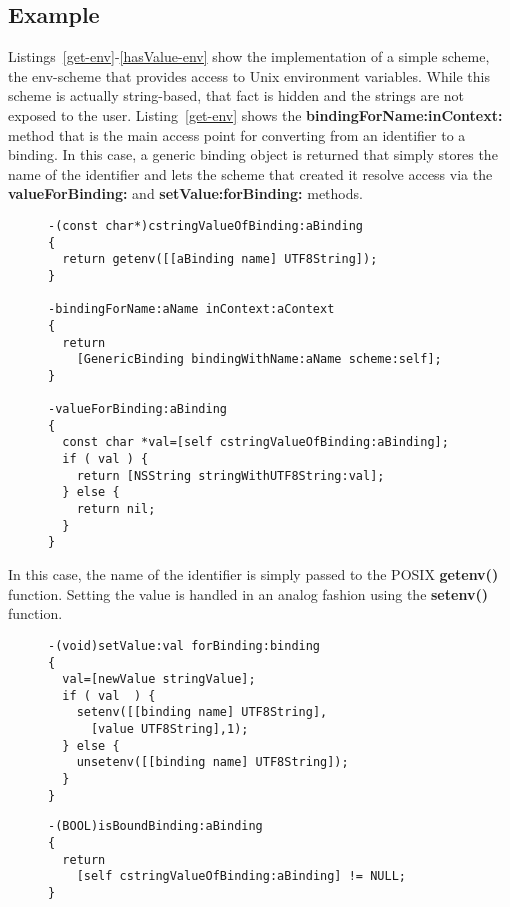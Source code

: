 \documentclass[preprint,authoryear]{acm_proc_article-sp}
\begin{document}
\subsection{Example}

Listings~\ref{get-env}-\ref{hasValue-env} show the implementation of a simple scheme,
the env-scheme that provides access to Unix environment variables.  While this scheme
is actually string-based, that fact is hidden and the strings are not exposed to the user.
Listing~\ref{get-env}
shows the {\bf bindingForName:inContext:} method that is the main access point for
converting from an identifier to a binding.  In this case, a generic binding object is returned
that simply stores the name of the identifier and lets the scheme that created it resolve
access via the {\bf valueForBinding:} and {\bf setValue:forBinding:} methods.


\begin{figure}[htbp]
\begin{lstlisting}[style=L,label=get-env,caption=Basic lookup in env: scheme.]
-(const char*)cstringValueOfBinding:aBinding
{
  return getenv([[aBinding name] UTF8String]);
}

-bindingForName:aName inContext:aContext
{
  return
    [GenericBinding bindingWithName:aName scheme:self];
}

-valueForBinding:aBinding
{
  const char *val=[self cstringValueOfBinding:aBinding];
  if ( val ) {
    return [NSString stringWithUTF8String:val];
  } else {
    return nil;
  }
}
\end{lstlisting}
\end{figure}

In this case, the name of the identifier is simply passed to the POSIX {\bf getenv()} function.
Setting the value is handled in an analog fashion using the {\bf setenv()} function.


\begin{figure}[htbp]
\begin{lstlisting}[style=L,label=setvalue-env,caption=Set value in env: scheme.]
-(void)setValue:val forBinding:binding
{
  val=[newValue stringValue];
  if ( val  ) {
    setenv([[binding name] UTF8String],
      [value UTF8String],1);
  } else {
    unsetenv([[binding name] UTF8String]);
  }
}
\end{lstlisting}
\end{figure}


\begin{figure}[htbp]
\begin{lstlisting}[style=L,label=hasValue-env,caption=Checking for presence of value in env: scheme.]
-(BOOL)isBoundBinding:aBinding
{
  return 
    [self cstringValueOfBinding:aBinding] != NULL;
}
\end{lstlisting}
\end{figure}
\end{document}
